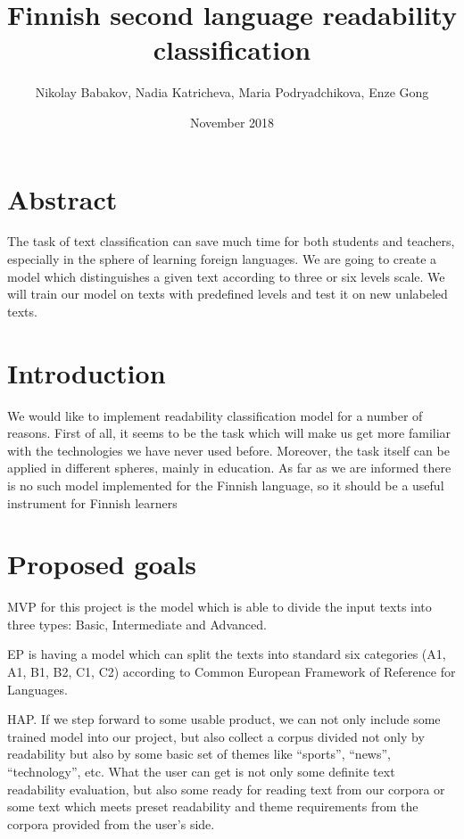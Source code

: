 \documentclass{article}
\title{Finnish second language readability classification 
}
\author{Nikolay Babakov, Nadia Katricheva, Maria Podryadchikova, Enze Gong
 }
\date{November 2018}
\begin{document}
\maketitle

\section{Abstract}
The task of text classification can save much time for both students and teachers, especially in the sphere of learning foreign languages. We are going to create a model which distinguishes a given text according to three or six levels scale. We will train our model on texts with predefined levels and test it on new unlabeled texts. 

\section{Introduction}
We would like to implement readability classification model for a number of reasons. First of all, it seems to be the task which will make us get more familiar with the technologies we have never used before. Moreover, the task itself can be applied in different spheres, mainly in education. 
As far as we are informed there is no such model implemented for the Finnish language, so it should be a useful instrument for Finnish learners

\section{Proposed goals}
MVP for this project is the model which is able to divide the input texts into three types: Basic, Intermediate and Advanced. 

EP is having a model which can split the texts into standard six categories (A1, A1, B1, B2, C1, C2) according to Common European Framework of Reference for Languages.

HAP.\newline
If we step forward to some usable product, we can not only include some trained model into our project, but also collect a corpus divided not only by readability but also by some basic set of themes like “sports”, “news”, “technology”, etc. What the user can get is not only some definite text readability evaluation, but also some ready for reading text from our corpora or some text which meets preset readability and theme requirements from the corpora provided from the user’s side. 
\end{document}
